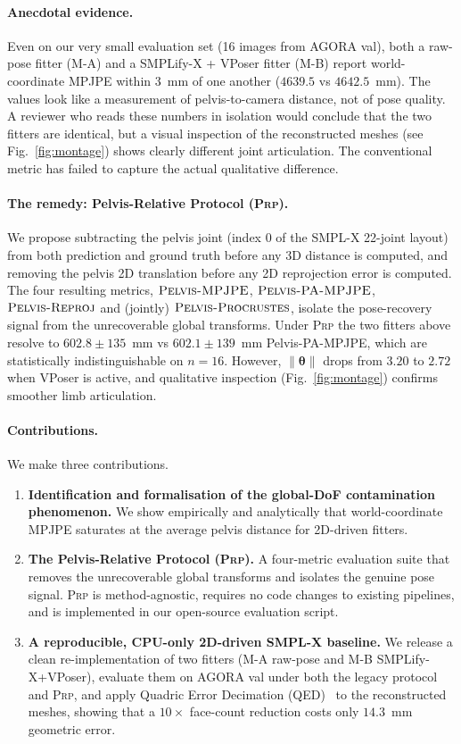 \documentclass[twocolumn,10pt]{svjour3}
\newcommand{\methodA}{\textsc{M-A}}
\newcommand{\methodB}{\textsc{M-B}}
\newcommand{\prp}{\textsc{Prp}}
\begin{document}
\paragraph{Anecdotal evidence.}
Even on our very small evaluation set (16 images from AGORA val), both a raw-pose fitter (\methodA{}) and a SMPLify-X + VPoser fitter (\methodB{}) report world-coordinate MPJPE within $3$~mm of one another ($4639.5$ vs $4642.5$~mm). The values look like a measurement of pelvis-to-camera distance, not of pose quality. A reviewer who reads these numbers in isolation would conclude that the two fitters are identical, but a visual inspection of the reconstructed meshes (see Fig.~\ref{fig:montage}) shows clearly different joint articulation. The conventional metric has failed to capture the actual qualitative difference.

\paragraph{The remedy: Pelvis-Relative Protocol (\prp).}
We propose subtracting the pelvis joint (index 0 of the SMPL-X 22-joint layout) from both prediction and ground truth before any 3D distance is computed, and removing the pelvis 2D translation before any 2D reprojection error is computed. The four resulting metrics, $\textsc{Pelvis-MPJPE}$, $\textsc{Pelvis-PA-MPJPE}$, $\textsc{Pelvis-Reproj}$ and (jointly) $\textsc{Pelvis-Procrustes}$, isolate the pose-recovery signal from the unrecoverable global transforms. Under \prp{} the two fitters above resolve to $602.8 \pm 135$~mm vs $602.1 \pm 139$~mm Pelvis-PA-MPJPE, which are statistically indistinguishable on $n=16$. However, $\|\boldsymbol{\theta}\|$ drops from $3.20$ to $2.72$ when VPoser is active, and qualitative inspection (Fig.~\ref{fig:montage}) confirms smoother limb articulation.

\paragraph{Contributions.}
We make three contributions.
\begin{enumerate}
  \item \textbf{Identification and formalisation of the global-DoF contamination phenomenon.} We show empirically and analytically that world-coordinate MPJPE saturates at the average pelvis distance for 2D-driven fitters.
  \item \textbf{The Pelvis-Relative Protocol (\prp).} A four-metric evaluation suite that removes the unrecoverable global transforms and isolates the genuine pose signal. \prp{} is method-agnostic, requires no code changes to existing pipelines, and is implemented in our open-source evaluation script.
  \item \textbf{A reproducible, CPU-only 2D-driven SMPL-X baseline.} We release a clean re-implementation of two fitters (\methodA{} raw-pose and \methodB{} SMPLify-X+VPoser), evaluate them on AGORA val under both the legacy protocol and \prp{}, and apply Quadric Error Decimation (QED)~\cite{QED} to the reconstructed meshes, showing that a $10\times$ face-count reduction costs only $14.3$~mm geometric error.
\end{enumerate}
\end{document}
